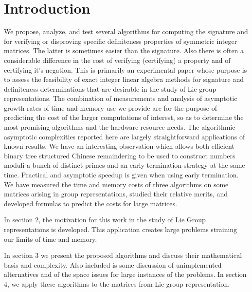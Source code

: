 \documentclass{acm_proc_article-sp}
\begin{document}


\section{Introduction}

We propose, analyze, and test several algorithms for 
computing the signature and for verifying or disproving specific
definiteness properties of symmetric integer matrices.  
The latter is sometimes easier than the signature.  
Also there is often a considerable difference in the 
cost of verifying (certifying) a property and of certifying it's negation.
This is primarily an experimental paper whose purpose is to assess the feasibility 
of exact integer linear algebra methods for signature and definiteness determinations
that are desirable in the study of Lie group representations.
The combination of measurements and analysis of asymptotic growth rates of time
and memory use we provide are for the purpose of predicting the cost of the larger
computations of interest, so as to determine the most promising algorithms and the 
hardware resource needs.
The algorithmic asymptotic complexities reported here are largely straightforward 
applications of known results. 
We have an interesting observation which
allows both efficient binary tree structured Chinese remaindering to be used to construct 
numbers moduli a bunch of distinct primes and an early termination strategy at the same time.
Practical and asymptotic speedup is given when using early termination.
We have measured the time and memory costs of three algorithms on some matrices arising
in group representations, 
studied their relative merits, and developed formulas to predict the costs for large matrices.

In section 2, the motivation for this work in the study of Lie Group
representations is developed.  This application creates large problems
straining our limits of time and memory.

In section 3 we present the proposed algorithms and discuss their mathematical
basis and complexity.
Also included is some discussion
of unimplemented alternatives and of the space issues for large instances
of the problems. In section 4, we apply these algorithms to the matrices from 
Lie group representation.
\end{document}
